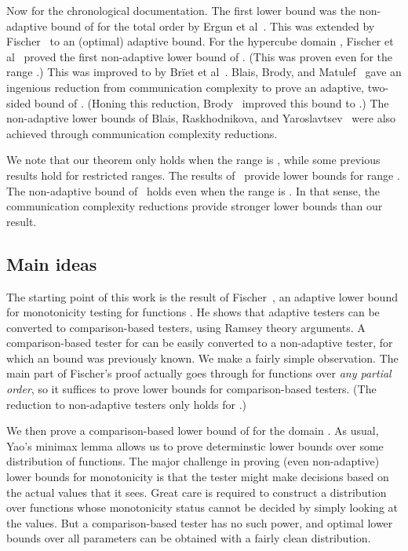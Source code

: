 \documentclass[11pt]{article}
\begin{document}
Now for the chronological documentation. The first lower bound was the non-adaptive bound of  for the total order  by Ergun et al~\cite{EKK+00}.
This was extended by Fischer~\cite{E04} to an (optimal) adaptive bound. For the hypercube domain ,
Fischer et al~\cite{FLNRRS02} proved the first non-adaptive lower bound of . (This was proven
even for the range .) This was improved to  by Br\"{i}et et al~\cite{BCG+10}.
Blais, Brody, and Matulef~\cite{BBM11} gave an ingenious reduction from communication complexity
to prove an adaptive, two-sided bound of . (Honing this reduction, Brody~\cite{Br13} improved this bound to .)
The non-adaptive lower bounds of Blais, Raskhodnikova, and Yaroslavtsev~\cite{BlJh+12} were also achieved
through communication complexity reductions.

We note that our theorem only holds when the range is , while some previous results hold for restricted
ranges. The results of~\cite{BBM11, Br13} provide lower bounds for range .
The non-adaptive bound of~\cite{BlJh+12} holds even when the range is . In that sense,
the communication complexity reductions provide stronger lower bounds than our result.

\subsection{Main ideas} \label{sec:ideas}

The starting point of this work is the result of Fischer~\cite{E04}, an adaptive lower bound for monotonicity
testing for functions . He shows that adaptive testers can be converted to comparison-based
testers, using Ramsey theory arguments. A comparison-based tester for  can be easily converted to a non-adaptive
tester, for which an  bound was previously known. We make a fairly simple observation. The main part of Fischer's proof
actually goes through for functions over \emph{any partial order}, so it suffices to prove lower bounds
for comparison-based testers. (The reduction to non-adaptive testers only holds for .)

We then prove a comparison-based lower bound of 
for the domain . 
As usual, Yao's minimax lemma allows us to prove determinstic lower bounds over some distribution of functions.
The major challenge in proving (even non-adaptive) lower bounds for monotonicity is that the tester might make decisions
based on the actual values that it sees. Great care is required to construct a distribution over functions
whose monotonicity status cannot be decided by simply looking at the values.
But a comparison-based tester has no such power, and
optimal lower bounds over all parameters can be obtained with a fairly clean distribution.
\end{document}
